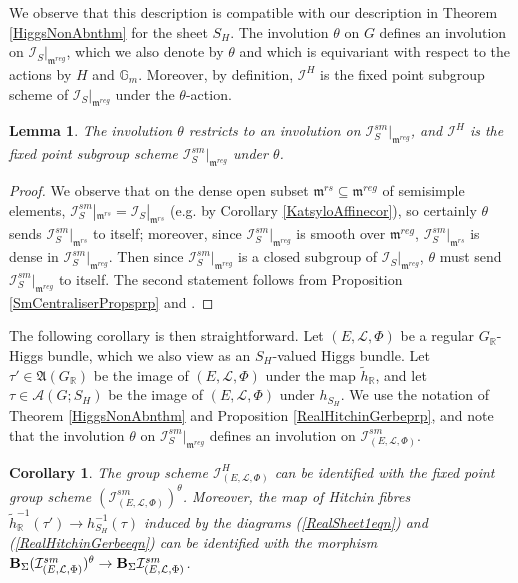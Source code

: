 \documentclass{amsart}
\newtheorem{lemma}[theorem]{Lemma}
\newtheorem{corollary}[theorem]{Corollary}
\theoremstyle{remark}
\numberwithin{theorem}{section}
\numberwithin{equation}{section}
\begin{document}
We observe that this description is compatible with our description in Theorem \ref{HiggsNonAbnthm} for the sheet $S_H$. The involution $\theta$ on $G$ defines an involution on $\mathcal I_S|_{\mathfrak{m}^{reg}}$, which we also denote by $\theta$ and which is equivariant with respect to the actions by $H$ and $\mathbb{G}_m$. Moreover, by definition, $\mathcal I^H$ is the fixed point subgroup scheme of $\mathcal I_S|_{\mathfrak{m}^{reg}}$ under the $\theta$-action.

\begin{lemma}\label{SmCentraliserInvlem}
   The involution $\theta$ restricts to an involution on $\mathcal I_S^{sm}|_{\mathfrak{m}^{reg}}$, and $\mathcal I^H$ is the fixed point subgroup scheme $\mathcal I^{sm}_S|_{\mathfrak{m}^{reg}}$ under $\theta$.
\end{lemma}

\begin{proof} 
We observe that on the dense open subset $\mathfrak{m}^{rs} \subseteq \mathfrak{m}^{reg}$ of semisimple elements, $\mathcal I_S^{sm}|_{\mathfrak{m}^{rs}} = \mathcal I_S|_{\mathfrak{m}^{rs}}$ (e.g. by Corollary \ref{KatsyloAffinecor}), so certainly $\theta$ sends $\mathcal I_S^{sm}|_{\mathfrak{m}^{rs}}$ to itself; moreover, since $\mathcal I_S^{sm}|_{\mathfrak{m}^{reg}}$ is smooth over $\mathfrak{m}^{reg}$, $\mathcal I_S^{sm}|_{\mathfrak{m}^{rs}}$ is dense in $\mathcal I_S^{sm}|_{\mathfrak{m}^{reg}}$. Then since $\mathcal I_S^{sm}|_{\mathfrak{m}^{reg}}$ is a closed subgroup of $\mathcal I_S|_{\mathfrak{m}^{reg}}$, $\theta$ must send $\mathcal I_S^{sm}|_{\mathfrak{m}^{reg}}$ to itself. The second statement follows from Proposition \ref{SmCentraliserPropsprp} and \cite[Theorem 3.10]{HM}.
\end{proof}

The following corollary is then straightforward. Let $(E,\mathcal L, \Phi)$ be a regular $G_\mathbb{R}$-Higgs bundle, which we also view as an $S_H$-valued Higgs bundle. Let $\tau' \in \mathfrak{A}(G_\mathbb{R})$ be the image of $(E,\mathcal L, \Phi)$ under the map $\tilde{h}_\mathbb{R}$, and let $\tau \in \mathcal A(G;S_H)$ be the image of $(E,\mathcal L, \Phi)$ under $h_{S_H}$. We use the notation of Theorem \ref{HiggsNonAbnthm} and Proposition \ref{RealHitchinGerbeprp}, and note that the involution $\theta$ on $\mathcal I_S^{sm}|_{\mathfrak{m}^{reg}}$ defines an involution on $\mathcal I^{sm}_{(E,\mathcal L,\Phi)}$.

\begin{corollary}\label{RealHitchinGerbecor}
    The group scheme $\mathcal I^H_{(E,\mathcal L,\Phi)}$ can be identified with the fixed point group scheme $(\mathcal I^{sm}_{(E,\mathcal L,\Phi)})^{\theta}$. Moreover, the map of Hitchin fibres $\tilde{h}_{\mathbb{R}}^{-1}(\tau') \rightarrow h_{S_H}^{-1}(\tau)$ induced by the diagrams (\ref{RealSheet1eqn}) and (\ref{RealHitchinGerbeeqn}) can be identified with the morphism ${\bf B}_{\Sigma}(\mathcal I_{(E,\mathcal L,\Phi)}^{sm})^\theta \rightarrow {\bf B}_{\Sigma}\mathcal I^{sm}_{(E,\mathcal L,\Phi)}$.
\end{corollary}
\end{document}
